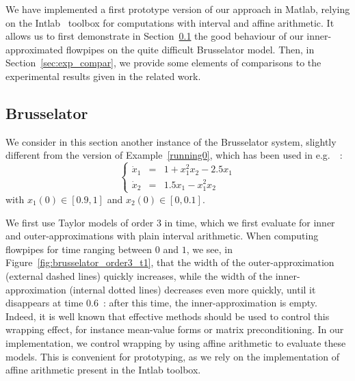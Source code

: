 We have implemented a first prototype version of our approach in Matlab, relying on the Intlab~\cite{Ru99a} 
toolbox for computations with interval and affine arithmetic.
It allows us to first demonstrate in Section~\ref{sec:exp_bruss} the good behaviour of our inner-approximated flowpipes
 on the quite difficult Brusselator model. %
Then, in Section~\ref{sec:exp_compar}, we provide some elements of comparisons to the experimental results 
given in the related work. 
 
\subsection{Brusselator}
\label{sec:exp_bruss}

We consider in this section another instance of the Brusselator system, slightly different  from the version of  Example~\ref{running0}, 
which has been used in e.g.~\cite{Underapproxflowpipes,underapprox16}~: 
$$\left\{\begin{array}{rcl}
\dot{x}_1 & = & 1+x_1^2x_2-2.5x_1 \\
\dot{x}_2 & = & 1.5x_1-x_1^2x_2
\end{array}\right.$$
\noindent with $x_1(0) \in [0.9,1]$ and $x_2(0) \in [0,0.1]$.

We first use Taylor models of order 3 in time, which we first evaluate for inner and outer-approximations 
with plain interval arithmetic. When computing flowpipes for time ranging between $0$ and $1$, 
we see, in Figure~\ref{fig:brusselator_order3_t1}, that the width of the outer-approximation 
(external dashed lines) quickly increases, while the 
width of the inner-approximation (internal dotted lines) decreases even more quickly, 
until it disappears at time 0.6~: after this time, the inner-approximation is empty. Indeed, it is well 
known that effective methods should be used to control this wrapping effect, for instance mean-value 
forms or matrix preconditioning. In our implementation, we control wrapping by using 
affine arithmetic to evaluate these models. %
This is convenient for prototyping, 
as we rely on the implementation of affine arithmetic present in the Intlab 
toolbox.
 
